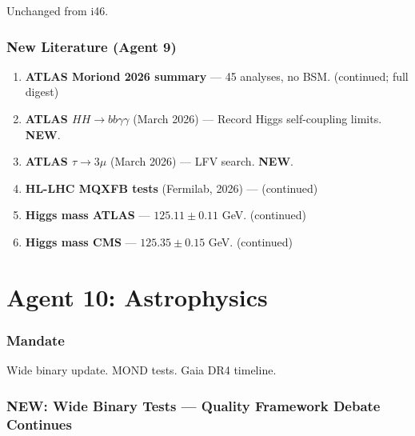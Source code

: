 \documentclass[11pt,a4paper]{article}
\newcommand{\NEW}{\textcolor{dfdblue}{\textbf{NEW}}}
\begin{document}
Unchanged from i46.

\section{New Literature (Agent 9)}

\begin{enumerate}
\item \textbf{ATLAS Moriond 2026 summary} --- 45 analyses, no BSM. (continued; full digest)
\item \textbf{ATLAS $HH \to bb\gamma\gamma$} (March 2026) --- Record Higgs self-coupling limits. \NEW.
\item \textbf{ATLAS $\tau \to 3\mu$} (March 2026) --- LFV search. \NEW.
\item \textbf{HL-LHC MQXFB tests} (Fermilab, 2026) --- (continued)
\item \textbf{Higgs mass ATLAS} --- $125.11 \pm 0.11$ GeV. (continued)
\item \textbf{Higgs mass CMS} --- $125.35 \pm 0.15$ GeV. (continued)
\end{enumerate}


\part{Agent 10: Astrophysics}
\label{part:agent10}

\section{Mandate}

Wide binary update. MOND tests. Gaia DR4 timeline.

\section{\NEW: Wide Binary Tests --- Quality Framework Debate Continues}
\end{document}
